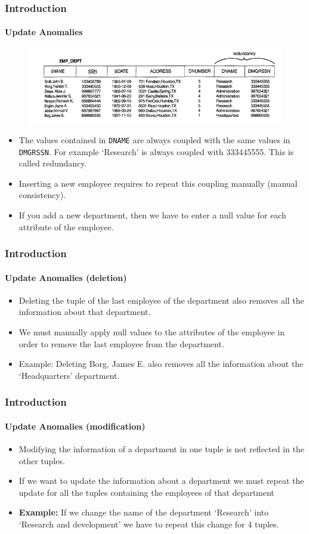 \documentclass{beamer}
\begin{document}
\begin{frame}
	\frametitle{Introduction}
	\framesubtitle{Update Anomalies}
	\begin{figure}
		\includegraphics[scale = 0.45]{img/normalization/norm2}
	\end{figure}
	\begin{itemize}
		\item The values contained in \texttt{DNAME} are always coupled with the same values in \texttt{DMGRSSN}. For example ‘Research’ is always coupled with 333445555. This is called redundancy.
		\item Inserting a new employee requires to repeat this coupling manually (manual consistency).
		\item If you add a new department, then we have to enter a null value for each attribute of the employee.
	\end{itemize}
\end{frame}

\begin{frame}
	\frametitle{Introduction}
	\framesubtitle{Update Anomalies (deletion)}
	
	\begin{itemize}
		\item Deleting the tuple of the last employee of the department also removes all the information about that department.
		\item We must manually apply null values to the attributes of the employee in order to remove the last employee from the department.
		\item Example: Deleting Borg, James E. also removes all the information about the ‘Headquarters’ department.		
	\end{itemize}
\end{frame}

\begin{frame}
	\frametitle{Introduction}
	\framesubtitle{Update Anomalies (modification)}
	
	\begin{itemize}
		\item Modifying the information of a department in one tuple is not reflected in the other tuples.
		\item If we want to update the information about a department we must repeat the update for all the tuples containing the employees of that department	
		\item \textbf{Example:}  If we change the name of the department ‘Research’ into ‘Research and development’ we have to repeat this change for 4 tuples.			
	\end{itemize}
\end{frame}
\end{document}

